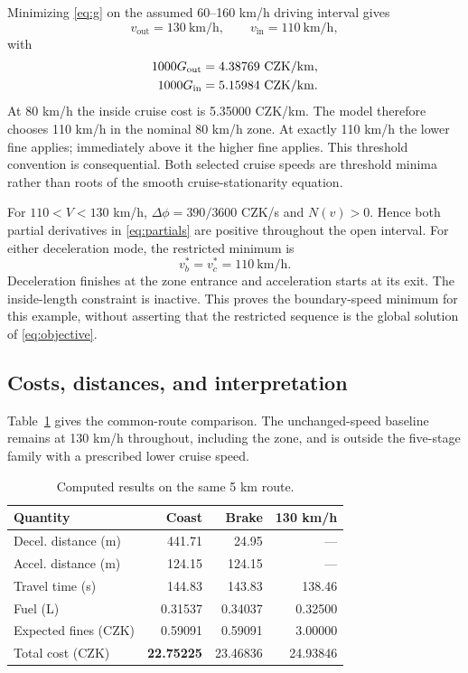 \documentclass[conference,a4paper]{IEEEtran}
\newcommand{\out}{\mathrm{out}}
\newcommand{\inn}{\mathrm{in}}
\newcommand{\CZK}{\mathrm{CZK}}
\begin{document}
Minimizing \eqref{eq:g} on the assumed 60--160 km/h driving interval gives
\begin{equation}
v_{\out}=130\ \mathrm{km/h},\qquad v_{\inn}=110\ \mathrm{km/h},
\end{equation}
with
\begin{align}
1000G_{\out}&=4.38769\ \CZK/\mathrm{km},\notag\\
1000G_{\inn}&=5.15984\ \CZK/\mathrm{km}.
\end{align}
At 80 km/h the inside cruise cost is 5.35000 CZK/km. The model therefore chooses 110 km/h in the nominal 80 km/h zone. At exactly 110 km/h the lower fine applies; immediately above it the higher fine applies. This threshold convention is consequential. Both selected cruise speeds are threshold minima rather than roots of the smooth cruise-stationarity equation.

For $110<V<130$ km/h, $\Delta\phi=390/3600$ CZK/s and $N(v)>0$. Hence both partial derivatives in \eqref{eq:partials} are positive throughout the open interval. For either deceleration mode, the restricted minimum is
\begin{equation}
v_b^*=v_c^*=110\ \mathrm{km/h}.
\end{equation}
Deceleration finishes at the zone entrance and acceleration starts at its exit. The inside-length constraint is inactive. This proves the boundary-speed minimum for this example, without asserting that the restricted sequence is the global solution of \eqref{eq:objective}.

\subsection{Costs, distances, and interpretation}
Table~\ref{tab:results} gives the common-route comparison. The unchanged-speed baseline remains at 130 km/h throughout, including the zone, and is outside the five-stage family with a prescribed lower cruise speed.
\begin{table}[!t]
\centering
\caption{Computed results on the same 5 km route.}
\label{tab:results}
\begin{tabular}{@{}lrrr@{}}
\toprule
Quantity & Coast & Brake & 130 km/h\\
\midrule
Decel. distance (m) & 441.71 & 24.95 & ---\\
Accel. distance (m) & 124.15 & 124.15 & ---\\
Travel time (s) & 144.83 & 143.83 & 138.46\\
Fuel (L) & 0.31537 & 0.34037 & 0.32500\\
Expected fines (CZK) & 0.59091 & 0.59091 & 3.00000\\
Total cost (CZK) & \textbf{22.75225} & 23.46836 & 24.93846\\
\bottomrule
\end{tabular}
\end{table}
\end{document}
